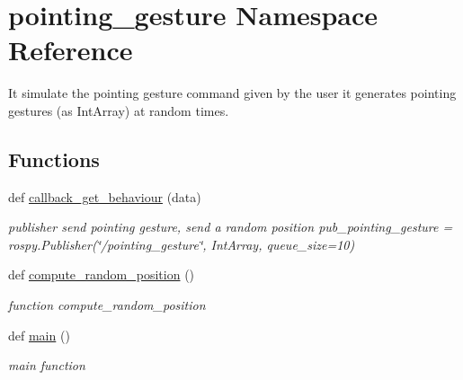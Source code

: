 \hypertarget{namespacepointing__gesture}{}\section{pointing\+\_\+gesture Namespace Reference}
\label{namespacepointing__gesture}


It simulate the pointing gesture command given by the user it generates pointing gestures (as Int\+Array) at random times.  


\subsection*{Functions}
\begin{DoxyCompactItemize}
\item 
def \hyperlink{namespacepointing__gesture_a0ccd291e8028504e94f37e49a5411b3d}{callback\+\_\+get\+\_\+behaviour} (data)
\begin{DoxyCompactList}\small\item\em publisher send pointing gesture, send a random position pub\+\_\+pointing\+\_\+gesture = rospy.\+Publisher(\char`\"{}/pointing\+\_\+gesture\char`\"{}, Int\+Array, queue\+\_\+size=10) \end{DoxyCompactList}\item 
def \hyperlink{namespacepointing__gesture_a3f243853d60010878f1a2dbbe2338dbd}{compute\+\_\+random\+\_\+position} ()
\begin{DoxyCompactList}\small\item\em function compute\+\_\+random\+\_\+position \end{DoxyCompactList}\item 
def \hyperlink{namespacepointing__gesture_a0246e9d31b3d0b62a01bdb5b697df181}{main} ()
\begin{DoxyCompactList}\small\item\em main function \end{DoxyCompactList}\end{DoxyCompactItemize}
